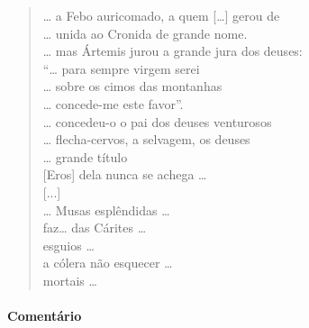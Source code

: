 \begin{verse}
\ldots{} a Febo auricomado, a quem [\ldots{}] gerou de \\
\ldots{} unida ao Cronida de grande nome.\\
\ldots{} mas Ártemis jurou a grande jura dos deuses:\\
``\ldots{} para sempre virgem serei\\
\ldots{} sobre os cimos das montanhas\\
\ldots{} concede-me este favor''.\\
\ldots{} concedeu-o o pai dos deuses venturosos\\
\ldots{} flecha-cervos, a selvagem, os deuses\\
\ldots{} grande título\\
{[}Eros{]} dela nunca se achega \ldots{}\\[2mm]

\hspace*{16mm}[...]\\[2mm]

\ldots{} Musas esplêndidas \ldots{}\\
faz\ldots{} das Cárites \ldots{}\\
esguios \ldots{}\\
a cólera não esquecer \ldots{}\\
mortais \ldots{}
\end{verse}

\medskip

\paragraph{Comentário} 

